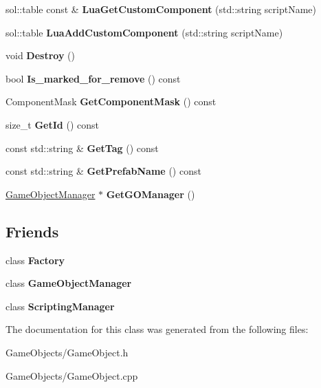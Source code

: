 \begin{DoxyCompactItemize}
\item 
\mbox{\label{classGameObject_a7838788ee6710528dbcb58e1c6400079}} 
sol\+::table const  \& {\bfseries Lua\+Get\+Custom\+Component} (std\+::string script\+Name)
\item 
\mbox{\label{classGameObject_a6fbe224c7ecc5562df50fccbaae30658}} 
sol\+::table {\bfseries Lua\+Add\+Custom\+Component} (std\+::string script\+Name)
\item 
\mbox{\label{classGameObject_abf1959fad10ea04673a182029f1f81b9}} 
void {\bfseries Destroy} ()
\item 
\mbox{\label{classGameObject_a812be3286e6e8d3839c844c507093395}} 
bool {\bfseries Is\+\_\+marked\+\_\+for\+\_\+remove} () const
\item 
\mbox{\label{classGameObject_aea7bddf2500f760afba95bb9daada51c}} 
Component\+Mask {\bfseries Get\+Component\+Mask} () const
\item 
\mbox{\label{classGameObject_a47a9e2307a23923343e23d6c8c4223c1}} 
size\+\_\+t {\bfseries Get\+Id} () const
\item 
\mbox{\label{classGameObject_a6ec65a8b875cfcf7d9155390579fcaab}} 
const std\+::string \& {\bfseries Get\+Tag} () const
\item 
\mbox{\label{classGameObject_a6f4378b0219e78cf1852e224ca6545b5}} 
const std\+::string \& {\bfseries Get\+Prefab\+Name} () const
\item 
\mbox{\label{classGameObject_ade4a81b6b0ed07ef656fc5c636ae648b}} 
\hyperlink{classGameObjectManager}{Game\+Object\+Manager} $\ast$ {\bfseries Get\+G\+O\+Manager} ()
\end{DoxyCompactItemize}
\subsection*{Friends}
\begin{DoxyCompactItemize}
\item 
\mbox{\label{classGameObject_a328c093d609680cca505905c6d49901a}} 
class {\bfseries Factory}
\item 
\mbox{\label{classGameObject_a1792bd89cabd9de04209188147625921}} 
class {\bfseries Game\+Object\+Manager}
\item 
\mbox{\label{classGameObject_ab3d6fafb2064bace492fd6b503d044f4}} 
class {\bfseries Scripting\+Manager}
\end{DoxyCompactItemize}


The documentation for this class was generated from the following files\+:\begin{DoxyCompactItemize}
\item 
Game\+Objects/Game\+Object.\+h\item 
Game\+Objects/Game\+Object.\+cpp\end{DoxyCompactItemize}
